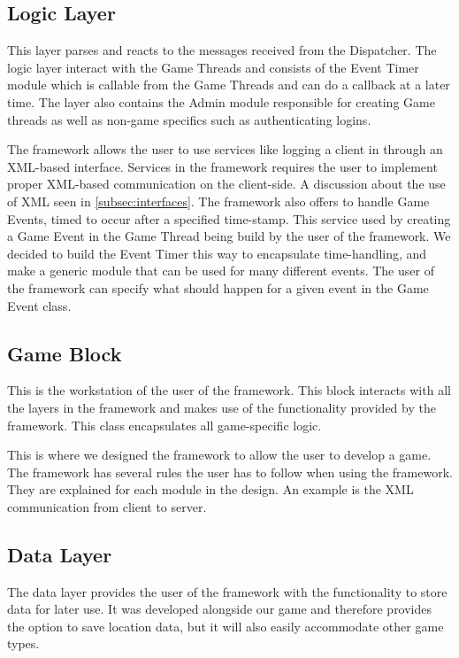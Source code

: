 


\subsection{Logic Layer}
This layer parses and reacts to the messages received from the Dispatcher. The logic layer interact with the Game Threads and consists of the Event Timer module which is callable from the Game Threads and can do a callback at a later time. The layer also contains the Admin module responsible for creating Game threads as well as non-game specifics such as authenticating logins.

The framework allows the user to use services like logging a client in through an XML-based interface. Services in the framework requires the user to implement proper XML-based communication on the client-side. A discussion about the use of XML seen in \ref{subsec:interfaces}. The framework also offers to handle Game Events, timed to occur after a specified time-stamp. This service used by creating a Game Event in the Game Thread being build by the user of the framework. We decided to build the Event Timer this way to encapsulate time-handling, and make a generic module that can be used for many different events. The user of the framework can specify what should happen for a given event in the Game Event class.




\subsection{Game Block}
This is the workstation of the user of the framework. This block interacts with all the layers in the framework and makes use of the functionality provided by the framework. This class encapsulates all game-specific logic.

This is where we designed the framework to allow the user to develop a game. The framework has several rules the user has to follow when using the framework. They are explained for each module in the design. An example is the XML communication from client to server.
 


\subsection{Data Layer}
The data layer provides the user of the framework with the functionality to store data for later use. It was developed alongside our game and therefore provides the option to save location data, but it will also easily accommodate other game types.



